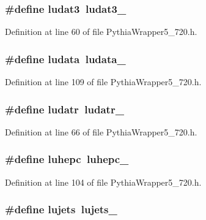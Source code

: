 \subsubsection{\setlength{\rightskip}{0pt plus 5cm}\#define ludat3~{\bf ludat3\_\-}}\label{PythiaWrapper5__720_8h_a8b13c42ffc5744a3aba1fe5baabe4df}




Definition at line 60 of file Pythia\-Wrapper5\_\-720.h.
\subsubsection{\setlength{\rightskip}{0pt plus 5cm}\#define ludata~ludata\_\-}\label{PythiaWrapper5__720_8h_df505d7fdc62691a470450edfa81be33}




Definition at line 109 of file Pythia\-Wrapper5\_\-720.h.
\subsubsection{\setlength{\rightskip}{0pt plus 5cm}\#define ludatr~{\bf ludatr\_\-}}\label{PythiaWrapper5__720_8h_a94676e67edfb3cd0424496b4e96a04c}




Definition at line 66 of file Pythia\-Wrapper5\_\-720.h.
\subsubsection{\setlength{\rightskip}{0pt plus 5cm}\#define luhepc~luhepc\_\-}\label{PythiaWrapper5__720_8h_7ab4e116928cd001fd894bb8f4a4d642}




Definition at line 104 of file Pythia\-Wrapper5\_\-720.h.
\subsubsection{\setlength{\rightskip}{0pt plus 5cm}\#define lujets~{\bf lujets\_\-}}\label{PythiaWrapper5__720_8h_22140d2cbcd02b3657c283774036ab21}




